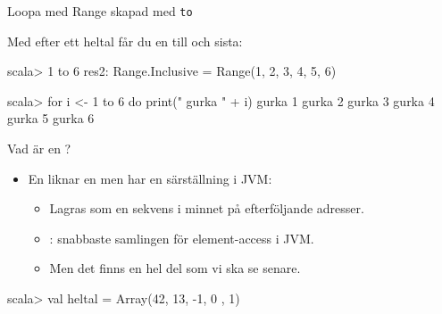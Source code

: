 \begin{Slide}{Loopa med Range skapad med \texttt{to}}

Med  efter ett heltal får du en  till och  sista:
\begin{REPLnonum}
scala> 1 to 6
res2: Range.Inclusive =
  Range(1, 2, 3, 4, 5, 6)

scala> for i <- 1 to 6 do print(" gurka " + i)
 gurka 1 gurka 2 gurka 3 gurka 4 gurka 5 gurka 6

\end{REPLnonum}


\end{Slide}



\begin{Slide}{Vad är en ?}


\begin{itemize}
\item En \href{https://en.wikipedia.org/wiki/Array_data_structure}{} liknar en  men har en särställning i JVM:
\begin{itemize}
\item Lagras som en sekvens i minnet på efterföljande adresser.
\item {}: snabbaste samlingen för element-access i JVM.
\item Men det finns en hel del  som vi ska se senare.
\end{itemize}

\end{itemize}

\begin{REPLnonum}
scala> val heltal = Array(42, 13, -1, 0 , 1)
\end{REPLnonum}

\end{Slide}

